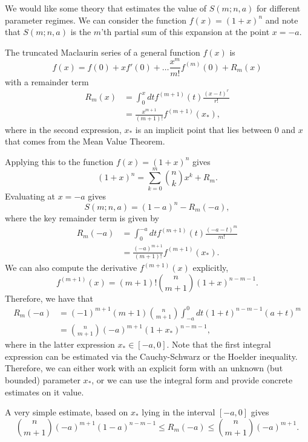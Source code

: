 We would like some theory that estimates the value of $S(m; n, a)$ for different parameter regimes. 
We can consider the function $f(x) = (1+x)^n$ and note that $S(m; n, a)$ is the $m$'th partial sum of this expansion at the point $x=-a$.

The truncated Maclaurin series of a general function $f(x)$ is
\begin{equation}
	f(x) = f(0) + x f'(0) + \dots \frac{x^m}{m!}f^{(m)}(0) + R_m(x)
\end{equation}
with a remainder term
\begin{align}
	R_m (x)&= \int_{0}^x dt f^{(m+1)}(t) \frac{(x-t)^r}{r!} \\
	&= \frac{x^{m+1}}{(m+1)!} f^{(m+1)}(x_*),
\end{align}
where in the second expression, $x_*$ is an implicit point that lies between $0$ and $x$ that comes from the Mean Value Theorem.

Applying this to the function $f(x) = (1+x)^n$ gives
\begin{equation}
	(1+x)^n = \sum_{k=0}^m \binom{n}{k} x^k + R_m.
\end{equation}
Evaluating at $x=-a$ gives
\begin{equation}
	S(m; n, a) = (1-a)^n - R_m(-a),
\end{equation}
where the key remainder term is given by
\begin{align}
	R_m(-a) &= \int_0^{-a} dt f^{(m+1)}(t) \frac{(-a-t)^m}{m!} \\
&= \frac{(-a)^{m+1}}{(m+1)!} f^{(m+1)}(x_*).
\end{align}
We can also compute the derivative $f^{(m+1)}(x)$ explicitly,
\begin{equation}
	f^{(m+1)}(x) = (m+1)!\binom{n}{m+1}(1+x)^{n-m-1}.
\end{equation}
Therefore, we have that
\begin{align}
	R_m(-a) &= (-1)^{m+1}(m+1)\binom{n}{m+1}\int_{-a}^0 dt (1+t)^{n-m-1}(a+t)^m \\
&= \binom{n}{m+1}(-a)^{m+1}(1+x_*)^{n-m-1},
\end{align}
where in the latter expression $x_* \in [-a,0]$. 
Note that the first integral expression can be estimated via the Cauchy-Schwarz or the Hoelder inequality. 
Therefore, we can either work with an explicit form with an unknown (but bounded) parameter $x_*$, or we can use the integral form and provide concrete estimates on it value.

A very simple estimate, based on $x_*$ lying in the interval $[-a,0]$ gives
\begin{equation}
\binom{n}{m+1}(-a)^{m+1}(1-a)^{n-m-1} \leq R_m(-a) \le  \binom{n}{m+1}(-a)^{m+1}.
\end{equation}

